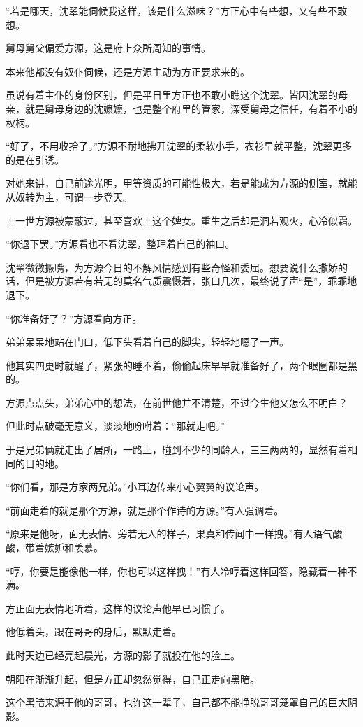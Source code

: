 \begin{this_body}
“若是哪天，沈翠能伺候我这样，该是什么滋味？”方正心中有些想，又有些不敢想。

舅母舅父偏爱方源，这是府上众所周知的事情。

本来他都没有奴仆伺候，还是方源主动为方正要求来的。

虽说有着主仆的身份区别，但是平日里方正也不敢小瞧这个沈翠。皆因沈翠的母亲，就是舅母身边的沈嬷嬷，也是整个府里的管家，深受舅母之信任，有着不小的权柄。

“好了，不用收拾了。”方源不耐地拂开沈翠的柔软小手，衣衫早就平整，沈翠更多的是在引诱。

对她来讲，自己前途光明，甲等资质的可能性极大，若是能成为方源的侧室，就能从奴转为主，可谓一步登天。

上一世方源被蒙蔽过，甚至喜欢上这个婢女。重生之后却是洞若观火，心冷似霜。

“你退下罢。”方源看也不看沈翠，整理着自己的袖口。

沈翠微微撅嘴，为方源今日的不解风情感到有些奇怪和委屈。想要说什么撒娇的话，但是被方源若有若无的莫名气质震慑着，张口几次，最终说了声“是”，乖乖地退下。

“你准备好了？”方源看向方正。

弟弟呆呆地站在门口，低下头看着自己的脚尖，轻轻地嗯了一声。

他其实四更时就醒了，紧张的睡不着，偷偷起床早早就准备好了，两个眼圈都是黑的。

方源点点头，弟弟心中的想法，在前世他并不清楚，不过今生他又怎么不明白？

但此时点破毫无意义，淡淡地吩咐着：“那就走吧。”

于是兄弟俩就走出了居所，一路上，碰到不少的同龄人，三三两两的，显然有着相同的目的地。

“你们看，那是方家两兄弟。”小耳边传来小心翼翼的议论声。

“前面走着的就是那个方源，就是那个作诗的方源。”有人强调着。

“原来是他呀，面无表情、旁若无人的样子，果真和传闻中一样拽。”有人语气酸酸，带着嫉妒和羡慕。

“哼，你要是能像他一样，你也可以这样拽！”有人冷哼着这样回答，隐藏着一种不满。

方正面无表情地听着，这样的议论声他早已习惯了。

他低着头，跟在哥哥的身后，默默走着。

此时天边已经亮起晨光，方源的影子就投在他的脸上。

朝阳在渐渐升起，但是方正却忽然觉得，自己正走向黑暗。

这个黑暗来源于他的哥哥，也许这一辈子，自己都不能挣脱哥哥笼罩自己的巨大阴影。


\end{this_body}

